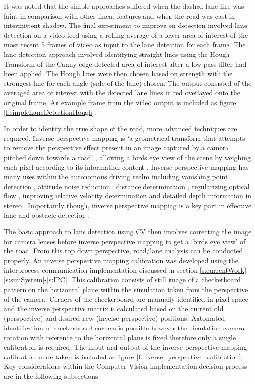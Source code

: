 \documentclass[]{aiaa-tc}%
\begin{document}
It was noted that the simple approaches suffered when the dashed lane line was faint in comparison with other linear features and when the road was cast in intermittent shadow. The final experiment to improve on detection involved lane detection on a video feed using a rolling average of a lower area of interest of the most recent 5 frames of video as input to the lane detection for each frame. The lane detection approach involved identifying straight lines using the Hough Transform of the Canny edge detected area of interest after a low pass filter had been applied. The Hough lines were then chosen based on strength with the strongest line for each angle (side of the lane) chosen. The output consisted of the averaged area of interest with the detected lane lines in red overlayed onto the original frame. An example frame from the video output is included as figure \ref{f:simpleLaneDetectionHough}. 

In order to identify the true shape of the road, more advanced techniques are required. Inverse perspective mapping is `a geometrical transform that attempts to remove the perspective effect present in an image captured by a camera pitched down towards a road' \citep{intersectionDetectionSingleCamera}, allowing a birds eye view of the scene by weighing each pixel according to its information content \citep{stereoIPM}. Inverse perspective mapping has many uses within the autonomous driving realm including vanishing point detection  \citep{ipmVanishingPoint}, attitude noise reduction \citep{ipmAttitudeNoise}, distance determination \citep{ipmDistanceDetermination}, regularizing optical flow \citep{ipmOpticalFlow}, improving relative velocity determination \citep{ipmOpticalFlowSpeed} and detailed depth information in stereo \citep{stereoIPM}. Importantly though, inverse perspective mapping is a key part in effective lane and obstacle detection \citep{ipmOpticalFlow} \citep{ipmDistanceDetermination} \citep{ipmBasedLaneDetectionApproach} \citep{ipmVanishingPoint}.

The basic approach to lane detection using CV then involves correcting the image for camera lenses before inverse perspective mapping to get a `birds eye view' of the road. From this top down perspective, road/lane analysis can be conducted properly. An inverse perspective mapping calibration was developed using the interprocess communication implementation discussed in section \ref{s:currentWork}-\ref{s:simSystem}-\ref{s:IPC}. This calibration consists of still image of a checkerboard pattern on the horizontal plane within the simulation taken from the perspective of the camera. Corners of the checkerboard are manually identified in pixel space and the inverse perspective matrix is calculated based on the current old (perspective) and desired new (inverse perspective) positions. Automated identification of checkerboard corners is possible however the simulation camera rotation with reference to the horizontal plane is fixed therefore only a single calibration is required. The input and output of the inverse perspective mapping calibration undertaken is included as figure \ref{f:inverse_perspective_calibration}. Key considerations within the Computer Vision implementation decision process are in the following subsections.
\end{document}
